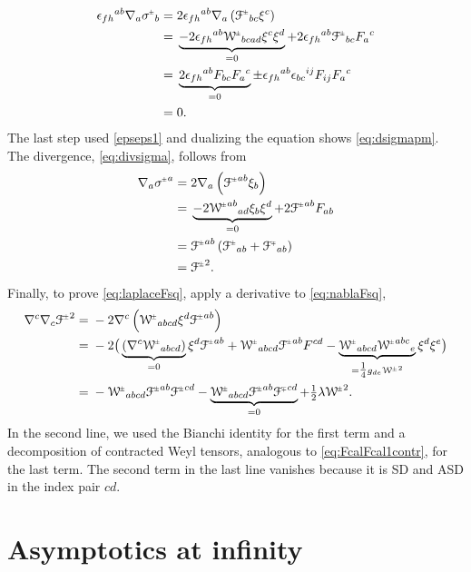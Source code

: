\documentclass[a4paper,10pt,reqno]{amsart}
\theoremstyle{plain}
\newcommand{\PM}[1]{{{#1}^{\hspace{-.5pt}\scaleto{\pm}{3.5pt}}}}
\newcommand{\MP}[1]{{{#1}^{\hspace{-.5pt}\scaleto{\mp}{3.5pt}}}}
\def\Wcal{\mathcal{W}}
\def\Fcal{\mathcal{F}}
\numberwithin{equation}{section}
\begin{document}
\begin{align}
\epsilon_{fh}{}^{ab} \nabla_{a}\PM{\sigma}_{b} 
={}& 2\epsilon_{fh}{}^{ab} \nabla_{a}\left( \PM{\Fcal}_{bc}\xi^c \right) \nonumber \\
={}& \underbrace{ -2 \epsilon_{fh}{}^{ab}\PM{\Wcal}_{bcad}\xi^c \xi^d}_{=0} + 2\epsilon_{fh}{}^{ab}\PM{\Fcal}_{bc} F_a{}^c \nonumber \\
={}&  \underbrace{ 2 \epsilon_{fh}{}^{ab}  F_{bc} F_a{}^c}_{=0}  \pm \epsilon_{fh}{}^{ab}  \epsilon_{bc}{}^{ij} F_{ij}  F_a{}^c \nonumber \\
={}& 0.
\end{align}
The last step used \eqref{epseps1} and dualizing the equation shows \eqref{eq:dsigmapm}. The divergence, \eqref{eq:divsigma}, follows from
\begin{align}
\nabla_{a}\PM{\sigma}^{a}
={}& 2 \nabla_{a} \left( \PM{\Fcal}^{ab}\xi_{b}\right)\nonumber \\
={}& \underbrace{-2\PM{\Wcal}^{ab}{}_{ad}\xi_{b}\xi^d}_{=0} +  2\PM{\Fcal}^{ab} F_{ab} 
\nonumber \\
={}& \PM{\Fcal}^{ab} \left( \PM{\Fcal}_{ab} + \MP{\Fcal}_{ab} \right) \nonumber \\
={}&\PM{\Fcal}^2.
\end{align}
Finally, to prove \eqref{eq:laplaceFsq}, apply a derivative to \eqref{eq:nablaFsq},
\begin{align}
\nabla^{c}\nabla_{c}\PM{\Fcal}^2
={}&-2 \nabla^{c} \left( \PM{\Wcal}_{abcd} \xi^{d}\PM{\Fcal}^{ab} \right) \nonumber \\
={}& -2 \big( \underbrace{(\nabla^{c} \PM{\Wcal}_{abcd})}_{=0} \xi^{d}\PM{\Fcal}^{ab} +\PM{\Wcal}_{abcd} \PM{\Fcal}^{ab} F^{cd}  - \underbrace{\PM{\Wcal}_{abcd}  \PM{\Wcal}^{abc}{}_{e}}_{= \tfrac{1}{4} g_{de}\PM{\Wcal}^2} \xi^{d} \xi^e \big) \nonumber \\
={}& - \PM{\Wcal}_{abcd} \PM{\Fcal}^{ab}  \PM{\Fcal}^{cd} - \underbrace{\PM{\Wcal}_{abcd} \PM{\Fcal}^{ab}  \MP{\Fcal}^{cd}}_{=0} +\tfrac{1}{2} \lambda \PM{\Wcal}^2.
\end{align}
In the second line, we used the Bianchi identity for the first term and a decomposition of contracted Weyl tensors, analogous to \eqref{eq:FcalFcal1contr}, for the last term. The second term in the last line vanishes because it is SD and ASD in the index pair $cd$.

%
\section{Asymptotics at infinity} \label{sec:asympinf}
%
\end{document}
